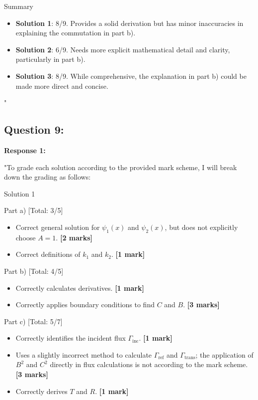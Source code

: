 \documentclass[a4paper,11pt]{article}
\begin{document}
Summary

\begin{itemize}
    \item \textbf{Solution 1}: 8/9. Provides a solid derivation but has minor inaccuracies in explaining the commutation in part b).
    \item \textbf{Solution 2}: 6/9. Needs more explicit mathematical detail and clarity, particularly in part b).
    \item \textbf{Solution 3}: 8/9. While comprehensive, the explanation in part b) could be made more direct and concise.
\end{itemize}
"

\subsection*{Question 9:}

\textbf{Response 1:}

"To grade each solution according to the provided mark scheme, I will break down the grading as follows:

Solution 1

Part a) [Total: 3/5]

\begin{itemize}
    \item Correct general solution for \(\psi_1(x)\) and \(\psi_2(x)\), but does not explicitly choose \(A = 1\). \textbf{[2 marks]}
    \item Correct definitions of \(k_1\) and \(k_2\). \textbf{[1 mark]}
\end{itemize}

Part b) [Total: 4/5]

\begin{itemize}
    \item Correctly calculates derivatives. \textbf{[1 mark]}
    \item Correctly applies boundary conditions to find \(C\) and \(B\). \textbf{[3 marks]}
\end{itemize}

Part c) [Total: 5/7]

\begin{itemize}
    \item Correctly identifies the incident flux \(\Gamma_{\text{inc}}\). \textbf{[1 mark]}
    \item Uses a slightly incorrect method to calculate \(\Gamma_{\text{ref}}\) and \(\Gamma_{\text{trans}}\); the application of \(B^2\) and \(C^2\) directly in flux calculations is not according to the mark scheme. \textbf{[3 marks]}
    \item Correctly derives \(T\) and \(R\). \textbf{[1 mark]}
\end{itemize}
\end{document}

